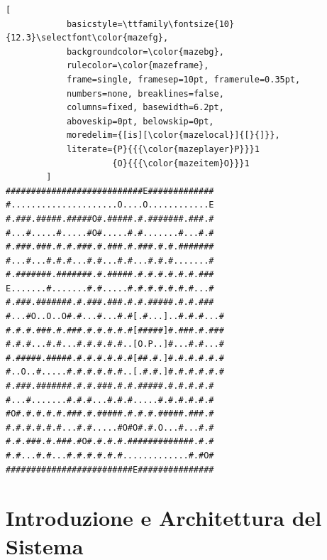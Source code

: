 \documentclass[11pt,a4paper]{article}
\begin{document}
\begin{titlepage}
    \par\vspace{1.3cm}
    \begin{minipage}{255pt}
        \begin{lstlisting}[
            basicstyle=\ttfamily\fontsize{10}{12.3}\selectfont\color{mazefg},
            backgroundcolor=\color{mazebg},
            rulecolor=\color{mazeframe},
            frame=single, framesep=10pt, framerule=0.35pt,
            numbers=none, breaklines=false,
            columns=fixed, basewidth=6.2pt,
            aboveskip=0pt, belowskip=0pt,
            moredelim={[is][\color{mazelocal}]{[}{]}},
            literate={P}{{{\color{mazeplayer}P}}}1
                     {O}{{{\color{mazeitem}O}}}1
        ]
###########################E#############
#.....................O....O............E
#.###.#####.#####O#.#####.#.#######.###.#
#...#.....#.....#O#.....#.#.......#...#.#
#.###.###.#.#.###.#.###.#.###.#.#.#######
#...#...#.#.#...#.#...#.#...#.#.#.......#
#.#######.#######.#.#####.#.#.#.#.#.#.###
E.......#.......#.#.....#.#.#.#.#.#.#...#
#.###.#######.#.###.###.#.#.#####.#.#.###
#...#O..O..O#.#...#...#.#[.#...]..#.#.#...#
#.#.#.###.#.###.#.#.#.#.#[#####]#.###.#.###
#.#.#...#.#...#.#.#.#.#..[O.P..]#...#.#...#
#.#####.#####.#.#.#.#.#.#[##.#.]#.#.#.#.#.#
#..O..#.....#.#.#.#.#.#..[.#.#.]#.#.#.#.#.#
#.###.#######.#.#.###.#.#.#####.#.#.#.#.#
#...#.......#.#.#...#.#.#.....#.#.#.#.#.#
#O#.#.#.#.#.###.#.#####.#.#.#.#####.###.#
#.#.#.#.#.#...#.#.....#O#O#.#.O...#...#.#
#.#.###.#.###.#O#.#.#.#.#############.#.#
#.#...#.#...#.#.#.#.#.#.............#.#O#
#########################E###############
\end{lstlisting}
    \end{minipage}
    \vfill
\end{titlepage}

\newpage
\tableofcontents
\newpage

\section{Introduzione e Architettura del Sistema}
\end{document}
